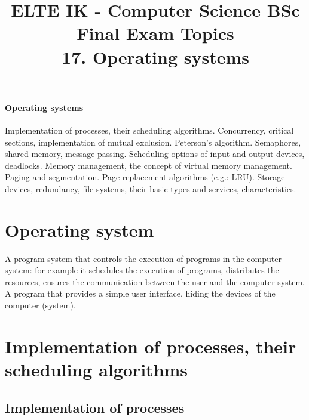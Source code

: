 \documentclass[margin=0px]{article}
\title{\textbf{{\Large ELTE IK - Computer Science BSc} \vspace{0.2cm} \\ {\huge Final Exam Topics}} \vspace{0.3cm} \\ 17. Operating systems}
\author{}
\date{}
\newenvironment{tetel}[1]{\paragraph{#1 \\}}{}
\begin{document}
\maketitle

\begin{center}
\end{center}

\begin{tetel}{Operating systems}
    Implementation of processes, their scheduling algorithms. Concurrency, critical sections, implementation of mutual exclusion. Peterson's algorithm. Semaphores, shared memory, message passing. Scheduling options of input and output devices, deadlocks. Memory management, the concept of virtual memory management. Paging and segmentation. Page replacement algorithms (e.g.: LRU). Storage devices, redundancy, file systems, their basic types and services, characteristics.
\end{tetel}

\section{Operating system}
A program system that controls the execution of programs in the computer system: for example it schedules the execution of programs, distributes the resources, ensures the communication between the user and the computer system. A program that provides a simple user interface, hiding the devices of the computer (system). \\

\section{Implementation of processes, their scheduling algorithms}

\subsection{Implementation of processes}
\end{document}
